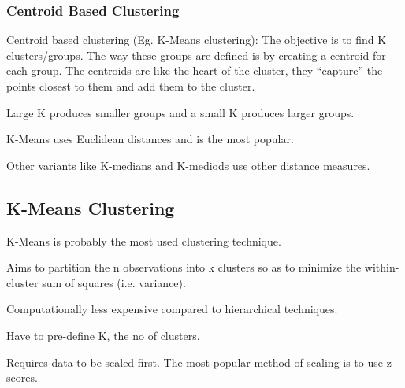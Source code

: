 	\subsubsection{Centroid Based Clustering}
Centroid based clustering (Eg. K-Means clustering): The objective is to find K clusters/groups. The way these groups are defined is by creating a centroid for each group. The centroids
are like the heart of the cluster, they ``capture'' the points closest to them and add them to the cluster.

	\begin{bulletedlist}
		\item Large K produces smaller groups and a small K produces larger groups.
		\item K-Means uses Euclidean distances and is the most popular.
		\item Other variants like K-medians and K-mediods use other distance measures.
	\end{bulletedlist}

	\subsection{K-Means Clustering}

	\begin{bulletedlist}
		\item K-Means is probably the most used clustering technique.
		\item Aims to partition the n observations into k clusters so as to minimize the within-cluster sum of squares (i.e. variance).
		\item Computationally less expensive compared to hierarchical techniques.
		\item Have to pre-define K, the no of clusters.
		\item Requires data to be scaled first.  The most popular method of scaling is to use z-scores.
	\end{bulletedlist}

